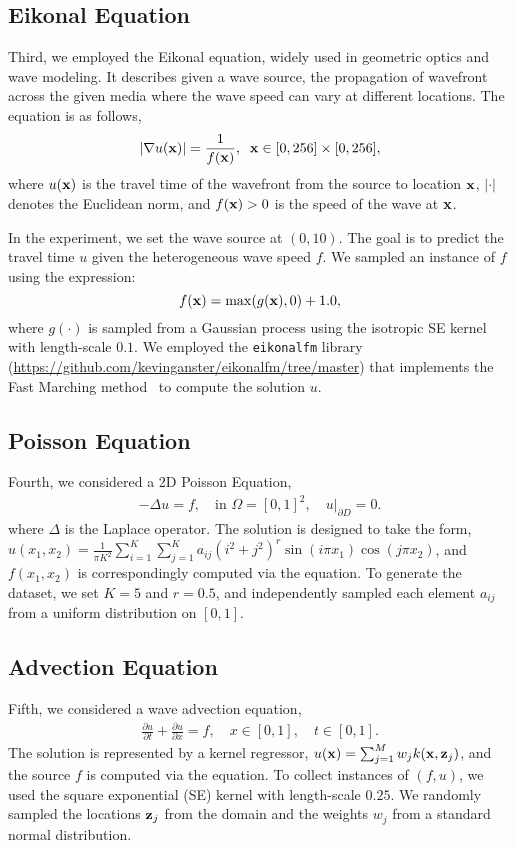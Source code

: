 \subsection{Eikonal Equation}
Third, we employed the Eikonal equation,  widely used in geometric optics and wave modeling. It describes given a wave source, the propagation of wavefront across the given media where the wave speed can vary at different locations. The equation is as follows, 
\begin{align}
    |\nabla u({\bf x})| = \frac{1}{f({\bf x})}, \;\;{\bf x} \in [0, 256] \times [0, 256],
\end{align}
where $u({\bf x})$ is the travel time of the wavefront from the source to location ${\bf x}$, $|\cdot|$ denotes the Euclidean norm, and $f({\bf x})>0$ is the speed of the wave at ${\bf x}$.

In the experiment, we set the wave source at $(0, 10)$. The goal is to predict the travel time $u$ given the heterogeneous wave speed $f$.  We sampled an instance of $f$ using the expression: 
\[
f({\bf x}) = \max(g({\bf x}), 0) + 1.0,
\]
where $g(\cdot)$ is sampled from a Gaussian process using the isotropic SE kernel with length-scale $0.1$. We employed the \texttt{eikonalfm} library (\url{https://github.com/kevinganster/eikonalfm/tree/master}) that implements the Fast Marching method~\cite{sethian1999fast} to compute the solution $u$. 


\subsection{Poisson Equation}
Fourth, we considered a 2D Poisson Equation,
\begin{align}
    -\Delta u = f, \quad \text{in } \Omega=[0, 1]^2, \quad u|_{\partial D} = 0.
\end{align}
where $\Delta$ is the Laplace operator. The solution is designed to take the form, $u(x_1, x_2)=\frac{1}{\pi K^2}\sum_{i=1}^K\sum_{j=1}^K a_{ij} (i^2+j^2)^r\sin(i \pi x_1)\cos(j \pi  x_2)$, and $f(x_1, x_2)$ is correspondingly computed via the equation.  To generate the dataset, we set $K=5$ and $r=0.5$, and independently sampled each element $a_{ij}$ from a uniform distribution on $[0, 1]$.



\subsection{Advection Equation}
Fifth, we considered a wave advection equation,
\begin{align}
\frac{\partial u}{\partial t} + \frac{\partial u}{\partial x} = f, \quad x \in [0,1], \quad t \in [0,1].
\end{align} 
The solution is represented by  a kernel regressor, $u({\bf x})= \sum_{j=1}^M w_j k({\bf x}, {\bf z}_j)$, and the source $f$ is computed via the equation. To collect instances of $(f, u)$, we used the square exponential (SE) kernel with length-scale $0.25$. We randomly sampled the locations ${\bf z}_j$ from the domain and the weights $w_j$ from a standard normal distribution. 

